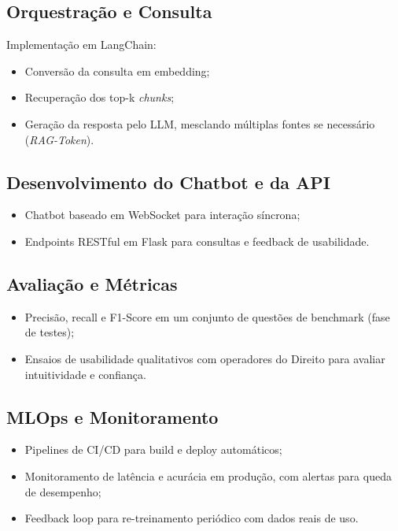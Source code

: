 \subsection{Orquestração e Consulta}
Implementação em LangChain:
\begin{itemize}[label=\textbullet]
  \item Conversão da consulta em embedding;
  \item Recuperação dos top-k \emph{chunks};
  \item Geração da resposta pelo LLM, mesclando múltiplas fontes se necessário (\emph{RAG-Token}).
\end{itemize}

\subsection{Desenvolvimento do Chatbot e da API}
\begin{itemize}[label=\textbullet]
  \item Chatbot baseado em WebSocket para interação síncrona;
  \item Endpoints RESTful em Flask para consultas e feedback de usabilidade.
\end{itemize}

\subsection{Avaliação e Métricas}
\begin{itemize}[label=\textbullet]
  \item Precisão, recall e F1-Score em um conjunto de questões de benchmark (fase de testes);
  \item Ensaios de usabilidade qualitativos com operadores do Direito para avaliar intuitividade e confiança.
\end{itemize}

\subsection{MLOps e Monitoramento}
\begin{itemize}[label=\textbullet]
  \item Pipelines de CI/CD para build e deploy automáticos;
  \item Monitoramento de latência e acurácia em produção, com alertas para queda de desempenho;
  \item Feedback loop para re-treinamento periódico com dados reais de uso.
\end{itemize}


